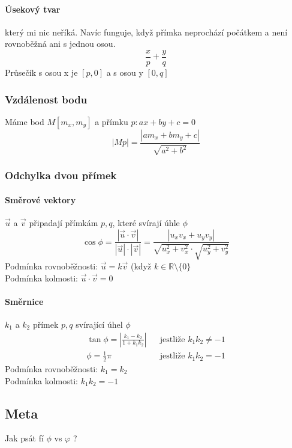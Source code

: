 \documentclass[12pt]{article}
\begin{document}
\paragraph{Úsekový tvar} který mi nic neříká. Navíc funguje, když přímka neprochází počátkem a není rovnoběžná ani s jednou osou.
\begin{equation}
\frac{x}{p} + \frac{y}{q}
\end{equation}
Průsečík s osou x je $[p,0]$ a s osou y $[0,q]$
\subsubsection{Vzdálenost bodu}
Máme bod $M[m_x,m_y]$ a přímku $p: ax + by +c =0$
\begin{equation}
|Mp| = \frac{\left| a m_x + b m_y + c\right|}{\sqrt{a^2 + b^2}}
\end{equation}
\subsubsection{Odchylka dvou přímek}
\paragraph{Směrové vektory} $\vec{u}$ a $\vec{v}$ připadají přímkám $p,q$, které svírají úhle $\phi$
\begin{equation}
\cos \phi = \frac{|\vec{u} \cdot \vec{v}|}{|\vec{u}| \cdot |\vec{v}|} = \frac{\left|u_x v_x + u_y v_y \right|}{\sqrt{u_x^2 + v_x^2} \cdot \sqrt{u_y^2 + v_y^2}}
\end{equation}
Podmínka rovnoběžnosti: $\vec{u} = k \vec{v}$ (když $k \in \mathbb{R} \setminus \{ 0 \}$\\
Podmínka kolmosti: $\vec{u} \cdot \vec{v} = 0$
\paragraph{Směrnice} $k_1$ a $k_2$ přímek $p,q$ svírající úhel $\phi$
\begin{align}
\tan \phi = \left| \frac{k_1-k_2}{1+k_1 k_2}\right| && \text{jestliže }k_1 k_2 \neq -1 \\
\phi = \frac{1}{2}\pi  && \text{jestliže }k_1 k_2 =  -1
\end{align}
Podmínka rovnoběžnosti: $k_1 =k_2$\\
Podmínka kolmosti: $k_1 k_2 = -1$
\subsection{Meta}
Jak psát fí $\phi$ vs $\varphi$ ?
\end{document}
